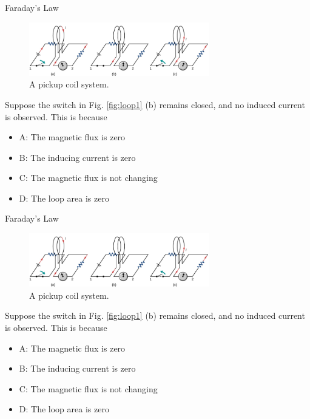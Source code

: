 \documentclass{beamer}
\begin{document}
\begin{frame}{Faraday's Law}
\small
\begin{figure}
\centering
\includegraphics[width=0.7\textwidth]{figures/farad2.png}
\caption{\label{fig:loop2} A pickup coil system.}
\end{figure}
Suppose the switch in Fig. \ref{fig:loop1} (b) remains closed, and no induced current is observed.  This is because
\begin{itemize}
\item A: The magnetic flux is zero
\item B: The inducing current is zero
\item C: The magnetic flux is not changing
\item D: The loop area is zero
\end{itemize}
\end{frame}

\begin{frame}{Faraday's Law}
\small
\begin{figure}
\centering
\includegraphics[width=0.7\textwidth]{figures/farad2.png}
\caption{\label{fig:loop3} A pickup coil system.}
\end{figure}
Suppose the switch in Fig. \ref{fig:loop1} (b) remains closed, and no induced current is observed.  This is because
\begin{itemize}
\item A: The magnetic flux is zero
\item B: The inducing current is zero
\item C: The magnetic flux is not changing
\item D: The loop area is zero
\end{itemize}
\end{frame}
\end{document}
